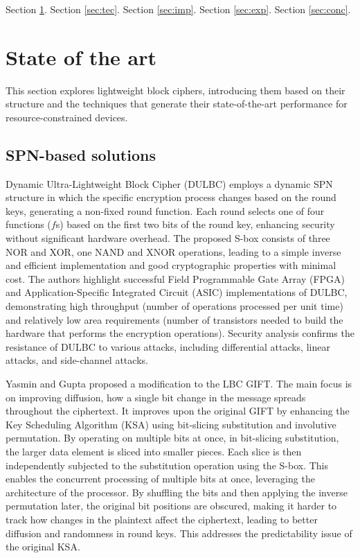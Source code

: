 \documentclass[conference]{IEEEtran}
\begin{document}
Section \ref{sec:art}.
Section \ref{sec:tec}.
Section \ref{sec:imp}.
Section \ref{sec:exp}.
Section \ref{sec:conc}.

\section{State of the art}\label{sec:art}

This section explores lightweight block ciphers, introducing them based on their structure and the techniques that generate their state-of-the-art performance for resource-constrained devices.

\subsection{SPN-based solutions}

Dynamic Ultra-Lightweight Block Cipher (DULBC) employs a dynamic SPN structure in which the specific encryption process changes based on the round keys, generating a non-fixed round function. Each round selects one of four functions ($f$s) based on the first two bits of the round key, enhancing security without significant hardware overhead. The proposed S-box consists of three NOR and XOR, one NAND and XNOR operations, leading to a simple inverse and efficient implementation and good cryptographic properties with minimal cost. The authors highlight successful Field Programmable Gate Array (FPGA) and Application-Specific Integrated Circuit (ASIC) implementations of DULBC, demonstrating high throughput (number of operations processed per unit time) and relatively low area requirements (number of transistors needed to build the hardware that performs the encryption operations). Security analysis confirms the resistance of DULBC to various attacks, including differential attacks, linear attacks, and side-channel attacks.


Yasmin and Gupta proposed a modification to the LBC GIFT\cite{GIFT}. The main focus is on improving diffusion, how a single bit change in the message spreads throughout the ciphertext. It improves upon the original GIFT by enhancing the Key Scheduling Algorithm (KSA) using bit-slicing substitution and involutive permutation. By operating on multiple bits at once, in bit-slicing substitution, the larger data element is sliced into smaller pieces. Each slice is then independently subjected to the substitution operation using the S-box. This enables the concurrent processing of multiple bits at once, leveraging the architecture of the processor. By shuffling the bits and then applying the inverse permutation later, the original bit positions are obscured, making it harder to track how changes in the plaintext affect the ciphertext, leading to better diffusion and randomness in round keys. This addresses the predictability issue of the original KSA\cite{yasmin2023modified}.
\end{document}
